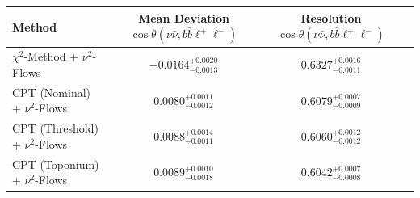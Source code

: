     \begin{tabular}{lccc}
        \toprule
        Method & Mean Deviation $\cos\theta(\nu\bar{\nu}, b\bar{b}\ell^+\ell^-)$ & Resolution $\cos\theta(\nu\bar{\nu}, b\bar{b}\ell^+\ell^-)$ \\
        \midrule
        $\chi^2$-Method + $\nu^2$-Flows & $-0.0164^{+0.0020}_{-0.0013}$ & $0.6327^{+0.0016}_{-0.0011}$ \\
        CPT (Nominal) + $\nu^2$-Flows & $0.0080^{+0.0011}_{-0.0012}$ & $0.6079^{+0.0007}_{-0.0009}$ \\
        CPT (Threshold) + $\nu^2$-Flows & $0.0088^{+0.0014}_{-0.0011}$ & $0.6060^{+0.0012}_{-0.0012}$ \\
        CPT (Toponium) + $\nu^2$-Flows & $0.0089^{+0.0010}_{-0.0018}$ & $0.6042^{+0.0007}_{-0.0008}$ \\
        \bottomrule
    \end{tabular}